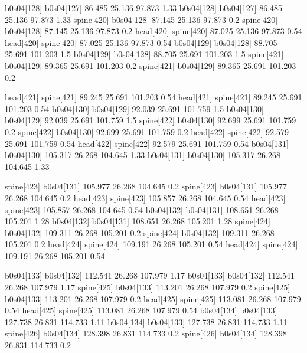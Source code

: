 b0s04[128]    b0s04[127]    86.485    25.136    97.873    1.33
b0s04[128]    b0s04[127]    86.485    25.136    97.873    1.33
spine[420]    b0s04[128]    87.145    25.136    97.873    0.2
spine[420]    b0s04[128]    87.145    25.136    97.873    0.2
head[420]    spine[420]    87.025    25.136    97.873    0.54
head[420]    spine[420]    87.025    25.136    97.873    0.54
b0s04[129]    b0s04[128]    88.705    25.691    101.203    1.5
b0s04[129]    b0s04[128]    88.705    25.691    101.203    1.5
spine[421]    b0s04[129]    89.365    25.691    101.203    0.2
spine[421]    b0s04[129]    89.365    25.691    101.203    0.2


head[421]    spine[421]    89.245    25.691    101.203    0.54
head[421]    spine[421]    89.245    25.691    101.203    0.54
b0s04[130]    b0s04[129]    92.039    25.691    101.759    1.5
b0s04[130]    b0s04[129]    92.039    25.691    101.759    1.5
spine[422]    b0s04[130]    92.699    25.691    101.759    0.2
spine[422]    b0s04[130]    92.699    25.691    101.759    0.2
head[422]    spine[422]    92.579    25.691    101.759    0.54
head[422]    spine[422]    92.579    25.691    101.759    0.54
b0s04[131]    b0s04[130]    105.317    26.268    104.645    1.33
b0s04[131]    b0s04[130]    105.317    26.268    104.645    1.33


spine[423]    b0s04[131]    105.977    26.268    104.645    0.2
spine[423]    b0s04[131]    105.977    26.268    104.645    0.2
head[423]    spine[423]    105.857    26.268    104.645    0.54
head[423]    spine[423]    105.857    26.268    104.645    0.54
b0s04[132]    b0s04[131]    108.651    26.268    105.201    1.28
b0s04[132]    b0s04[131]    108.651    26.268    105.201    1.28
spine[424]    b0s04[132]    109.311    26.268    105.201    0.2
spine[424]    b0s04[132]    109.311    26.268    105.201    0.2
head[424]    spine[424]    109.191    26.268    105.201    0.54
head[424]    spine[424]    109.191    26.268    105.201    0.54


b0s04[133]    b0s04[132]    112.541    26.268    107.979    1.17
b0s04[133]    b0s04[132]    112.541    26.268    107.979    1.17
spine[425]    b0s04[133]    113.201    26.268    107.979    0.2
spine[425]    b0s04[133]    113.201    26.268    107.979    0.2
head[425]    spine[425]    113.081    26.268    107.979    0.54
head[425]    spine[425]    113.081    26.268    107.979    0.54
b0s04[134]    b0s04[133]    127.738    26.831    114.733    1.11
b0s04[134]    b0s04[133]    127.738    26.831    114.733    1.11
spine[426]    b0s04[134]    128.398    26.831    114.733    0.2
spine[426]    b0s04[134]    128.398    26.831    114.733    0.2


